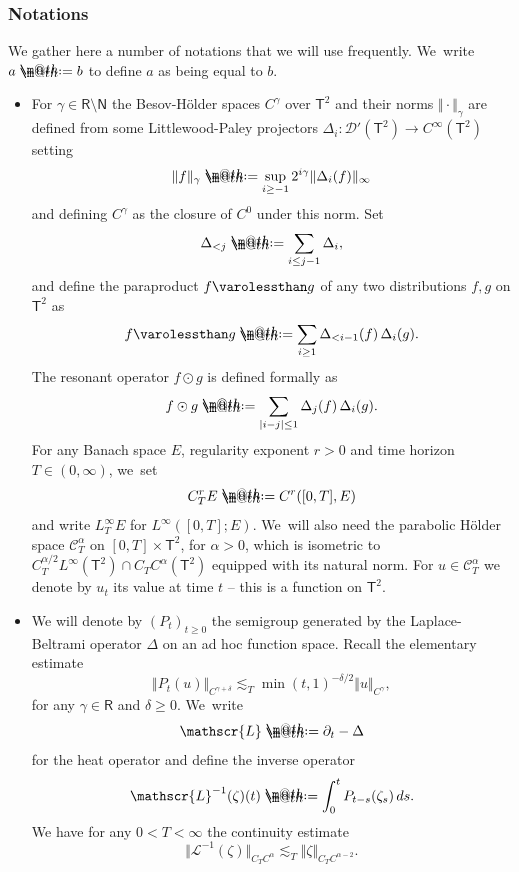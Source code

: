 \documentclass[10pt]{amsart}
\makeatletter
\theoremstyle{definition}
\newcommand\bbN{\mathbf{\mathsf{N}}}
\newcommand\bbR{\mathbf{\mathsf{R}}}
\newcommand{\bsfT}{\mathbf{\mathsf{T}}}
\newcommand{\mcD}{\mathcal{D}}
\newcommand{\scrC}{\ensuremath{\mathscr{C}}}
\newcommand*{\defeq}{\mathrel{\rlap{%
\raisebox{0.3ex}{$\m@th\cdot$}}%
\raisebox{-0.3ex}{$\m@th\cdot$}}%
=}
\newcommand{\norme}[1]{\Vert #1 \Vert}
\newcommand{\scrL}{\mathscr{L}}
\makeatother
\begin{document}
\subsubsection*{Notations} We gather here a number of notations that we will use frequently. We~write $a \defeq b$ to define $a$ as being equal to $b$.
\begin{itemize}
\item
For $\gamma\in\bbR\setminus\bbN$ the Besov-Hölder spaces $C^\gamma$ over $\bsfT^2$ and their norms $\Vert{\cdot}\Vert_\gamma$ are defined from some Littlewood-Paley projectors $\Delta_i : \mcD'(\bsfT^2)\to C^\infty(\bsfT^2)$ setting
\[
\Vert f\Vert_\gamma \defeq \sup_{i\geq -1} 2^{i\gamma} \Vert \Delta_i(f)\Vert_\infty
\]
and defining $C^\gamma$ as the closure of $C^0$ under this norm. Set
\[
\Delta_{<j} \defeq \sum_{i\leq j-1}\Delta_i,
\]
and define the paraproduct $f\varolessthan g$ of any two distributions $f,g$ on $\bsfT^2$ as
\begin{equation} \label{EqParaproduit}
f \varolessthan g \defeq \sum_{i\geq 1} \Delta_{<i-1}(f)\,\Delta_i(g).
\end{equation}
The resonant operator $f\odot g$ is defined formally as
\begin{equation} \label{EqResonance}
f\odot g \defeq \sum_{\vert i-j\vert\leq 1} \Delta_j(f)\,\Delta_i(g).
\end{equation}
For any Banach space $E$, regularity exponent $r>0$ and time horizon $T\in(0,\infty)$, we~set
\[
C_T^r E \defeq C^r([0,T],E)
\]
and write $L^\infty_TE$ for $L^\infty([0,T];E)$. We~will also need the parabolic Hölder space $\scrC^\alpha_T$ on $[0,T]\times\bsfT^2$, for $\alpha>0$, which is isometric to $C^{\alpha/2}_TL^\infty(\bsfT^2) \cap C_T C^\alpha(\bsfT^2)$ equipped with its natural norm. For $u \in \scrC^\alpha_T$ we denote by $u_t$ its value at time $t$ -- this is a function on $\bsfT^2$.

\item
We will denote by $(P_t)_{t \geq 0}$ the semigroup generated by the Laplace-Beltrami operator $\Delta$ on an ad hoc function space. Recall the elementary estimate
\begin{equation} \label{EqHeatEstimate}
\norme{P_t(u)}_{C^{\gamma+\delta}}\lesssim_T \min(t,1)^{-\delta/2}\norme{u}_{C^\gamma},
\end{equation}
for any $\gamma\in\bbR$ and $\delta\geq 0$. We~write
\[
\mathscr{L} \defeq \partial_t-\Delta
\]
for the heat operator and define the inverse operator
\[
\mathscr{L}^{-1}(\zeta)(t) \defeq \int_0^t P_{t-s}(\zeta_s) \, ds.
\]
We have for any $0<T<\infty$ the continuity estimate
\begin{equation} \label{EqBoundIntegration}
\Vert \scrL^{-1}(\zeta)\Vert_{C_TC^\alpha} \lesssim_T \Vert \zeta\Vert_{C_T C^{\alpha-2}}.
\end{equation}


\end{itemize}
\end{document}
